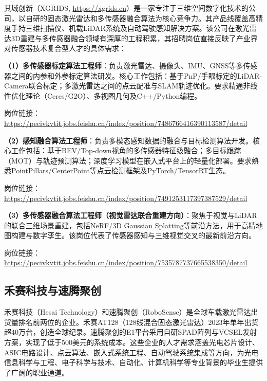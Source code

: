 \documentclass[12pt,a4paper,openany,UTF8]{ctexbook}
\begin{document}
其域创新（XGRIDS, \url{https://xgrids.cn}）是一家专注于三维空间数字化技术的公司，以自研的固态激光雷达和多传感器融合算法为核心竞争力。其产品线覆盖高精度手持三维扫描仪、机载LiDAR系统及自动驾驶感知解决方案。该公司在激光雷达3D重建与多传感器融合领域有深厚的工程积累，其招聘岗位直接反映了产业界对传感器技术复合型人才的具体需求：

\textbf{（1）多传感器标定算法工程师}：负责激光雷达、摄像头、IMU、GNSS等多传感器之间的内参和外参标定算法研发。核心工作包括：基于PnP/手眼标定的LiDAR-Camera联合标定；多激光雷达之间的点云配准与SLAM轨迹优化。要求精通非线性优化理论（Ceres/G2O）、多视图几何及C++/Python编程。\par
\smallskip
{\footnotesize\color{gray}岗位链接：\url{https://pecivkvtit.jobs.feishu.cn/index/position/7486766416390113587/detail}\par}

\textbf{（2）感知融合算法工程师}：负责多模态感知数据的融合与目标检测算法开发。核心工作包括：基于BEV/Top-down视角的多传感器特征级融合；多目标跟踪（MOT）与轨迹预测算法；深度学习模型在嵌入式平台上的轻量化部署。要求熟悉PointPillars/CenterPoint等点云检测框架及PyTorch/TensorRT生态。\par
\smallskip
{\footnotesize\color{gray}岗位链接：\url{https://pecivkvtit.jobs.feishu.cn/index/position/7491253117397387529/detail}\par}

\textbf{（3）多传感器融合算法工程师（视觉雷达联合重建方向）}：聚焦于视觉与LiDAR的联合三维场景重建，包括NeRF/3D Gaussian Splatting等前沿方法，用于高精地图构建与数字孪生。该岗位代表了传感器感知与三维视觉交叉的最新前沿方向。\par
\smallskip
{\footnotesize\color{gray}岗位链接：\url{https://pecivkvtit.jobs.feishu.cn/index/position/7535787737665538350/detail}\par}

\subsection{禾赛科技与速腾聚创}

禾赛科技（Hesai Technology）和速腾聚创（RoboSense）是全球车载激光雷达出货量排名前两位的企业。禾赛AT128（128线混合固态激光雷达）2023年单年出货超40万台，创造全球纪录。速腾聚创的E1平台采用自研SPAD阵列与VCSEL发射方案，实现了低于500美元的系统成本。这些企业的人才需求涵盖光电芯片设计、ASIC电路设计、点云算法、嵌入式系统工程、自动驾驶系统集成等方向，为光电信息科学与工程、电子科学与技术、自动化、计算机科学等专业背景的毕业生提供了广阔的职业通道。
\end{document}
